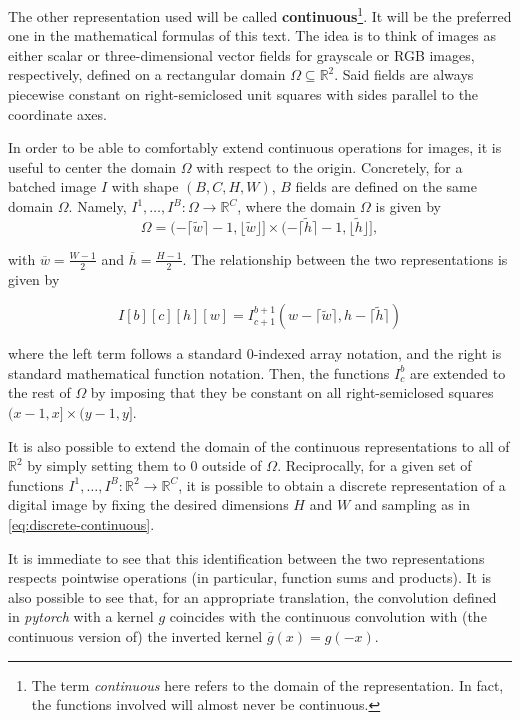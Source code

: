 \documentclass[twocolumn,twoside,a4paper,10pt]{IEEEtran}
\begin{document}
The other representation used will be called \textbf{continuous}\footnote{The term \textit{continuous} here refers to the domain of the representation. In fact, the functions involved will almost never be continuous.}. It will be the preferred one in the mathematical formulas of this text. The idea is to think of images as either scalar or three-dimensional vector fields for grayscale or RGB images, respectively, defined on a rectangular domain \(\Omega\subseteq \mathbb{R}^2\). Said fields are always piecewise constant on right-semiclosed unit squares with sides parallel to the coordinate axes.

In order to be able to comfortably extend continuous operations for images, it is useful to center the domain \(\Omega\) with respect to the origin. Concretely, for a batched image \(I\) with shape \((B, C, H, W)\), \(B\)  fields are defined on the same domain \(\Omega\). Namely, \(I^1, \dots, I^B\colon\Omega\to \mathbb{R}^C\), where the domain \(\Omega\) is given by
\[
  \Omega = (-\lceil \tilde{w}\rceil - 1, \lfloor \tilde{w}\rfloor]\times(-\lceil \tilde{h}\rceil -1, \lfloor \tilde{h}\rfloor]
,\]

with \(\overline{w}=\frac{W-1}{2}\) and \(\overline{h}=\frac{H-1}{2}\). The relationship between the two representations is given by

\begin{equation}\label{eq:discrete-continuous}
  I[b][c][h][w] = I^{b+1}_{c+1}(w - \lceil\tilde{w}\rceil, h - \lceil\tilde{h}\rceil)
\end{equation}

where the left term follows a standard \(0\)-indexed array notation, and the right is standard mathematical function notation. Then, the functions \(I^b_c\) are extended to the rest of \(\Omega\) by imposing that they be constant on all right-semiclosed squares \((x-1,x]\times(y-1, y]\).

It is also possible to extend the domain of the continuous representations to all of \(\mathbb{R}^2\) by simply setting them to \(0\) outside of \(\Omega\). Reciprocally, for a given set of functions \(I^1, \dots, I^B\colon \mathbb{R}^2\to \mathbb{R}^C\), it is possible to obtain a discrete representation of a digital image by fixing the desired dimensions \(H\) and \(W\) and sampling as in \cref{eq:discrete-continuous}.

It is immediate to see that this identification between the two representations respects pointwise operations (in particular, function sums and products). It is also possible to see that, for an appropriate translation, the convolution defined in \textit{pytorch} with a kernel \(g\) coincides with the continuous convolution with (the continuous version of) the inverted kernel \(\overline{g}(x) = g(-x)\).
\end{document}
